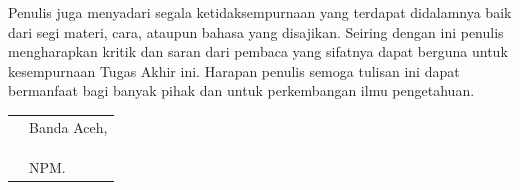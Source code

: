 Penulis juga menyadari segala ketidaksempurnaan yang terdapat didalamnya baik dari segi materi, cara, ataupun bahasa yang disajikan. Seiring dengan ini penulis mengharapkan kritik dan saran dari pembaca yang sifatnya dapat berguna untuk kesempurnaan Tugas Akhir ini. Harapan penulis semoga tulisan ini dapat bermanfaat bagi banyak pihak dan untuk perkembangan ilmu pengetahuan.

\vspace{1cm}


\begin{tabular}{p{7.5cm}l}
	&Banda Aceh, \@tanggalhari\space\@tanggalbulan\space\@tanggaltahun\\
	&\\
	&\\
	&\multirow{1.5}{7.5cm}{\underline{\@fullname}} \\ 
	&NPM. \@idnum \\
\end{tabular}
\makeatother